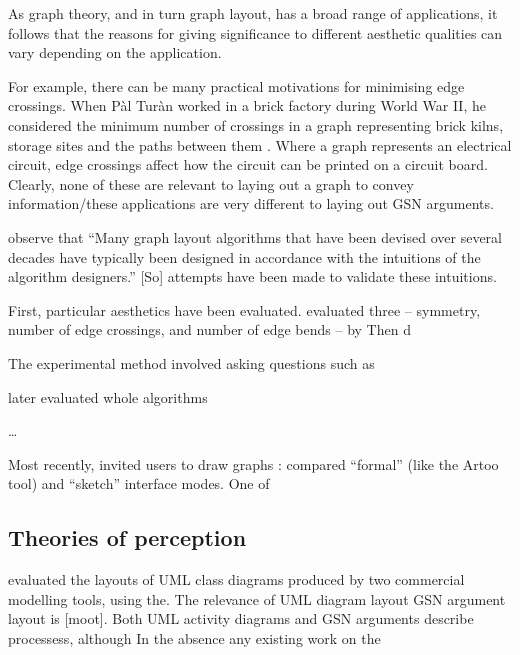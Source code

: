 As graph theory, and in turn graph layout, has a broad range of applications, it follows that the reasons for giving significance to different aesthetic qualities can vary depending on the application.

For example, there can be many practical motivations for minimising edge crossings.
When P\`{a}l Tur\`{a}n worked in a brick factory during World War II,
he considered the minimum number of crossings in a graph representing
brick kilns, storage sites and the paths between them .
Where a graph represents an electrical circuit, edge crossings affect how the circuit can be printed on a circuit board.
Clearly, none of these are relevant to laying out a graph to convey information/these applications are very different to laying out GSN arguments.

\citet{5674033} observe that ``Many graph layout algorithms that have been devised over
several decades have typically been designed in accordance with the intuitions of the algorithm designers.'' [So] attempts have been made to validate these intuitions.

First, particular aesthetics have been evaluated. \citet{Purchase1997basis} evaluated three -- symmetry, number of edge crossings, and number of edge bends -- by Then \citet{Purchase1997which} d

The experimental method involved asking questions such as 

\citet{PURCHASE1998647} later evaluated whole algorithms

\ldots

Most recently, \citet{5674033} invited users to draw graphs :
compared ``formal'' (like the Artoo tool) and ``sketch'' interface modes.
One of



\subsection{Theories of perception}

\citet{kennysun} evaluated the layouts of UML class diagrams produced by two commercial modelling tools, using the.
The relevance of UML diagram layout GSN argument layout is [moot]. Both UML activity diagrams and GSN arguments describe processess, although \citeauthor{kennysun}  In the absence any existing work on the 


